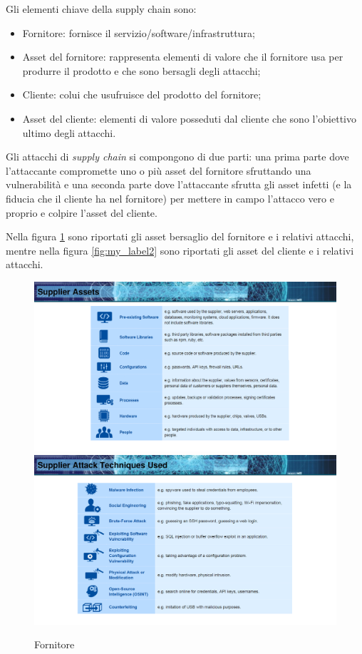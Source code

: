 \noindent Gli elementi chiave della supply chain sono:
\begin{itemize}
    \item Fornitore: fornisce il servizio/software/infrastruttura;
    \item Asset del fornitore: rappresenta elementi di valore che il fornitore usa per produrre il prodotto e che sono bersagli degli attacchi;
    \item Cliente: colui che usufruisce del prodotto del fornitore;
    \item Asset del cliente: elementi di valore posseduti dal cliente che sono l'obiettivo ultimo degli attacchi.
\end{itemize}

\noindent Gli attacchi di \textit{supply chain} si compongono di due parti: una prima parte dove l'attaccante compromette uno o più asset del fornitore sfruttando una vulnerabilità e una seconda parte dove l'attaccante sfrutta gli asset infetti (e la fiducia che il cliente ha nel fornitore) per mettere in campo l'attacco vero e proprio e colpire l'asset del cliente.

Nella figura \ref{fig:my_label} sono riportati gli asset bersaglio del fornitore e i relativi attacchi, mentre nella figura \ref{fig:my_label2} sono riportati gli asset del cliente e i relativi attacchi.

\begin{figure}
    \centering
    \includegraphics[width=1\textwidth]{images/1.png}
    \includegraphics[width=1\textwidth]{images/2.png}
    \caption{Fornitore}
    \label{fig:my_label}
\end{figure}

